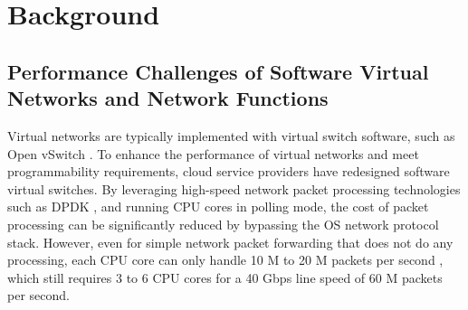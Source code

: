 \section{Background}
\label{clicknp:sec:background}

\subsection{Performance Challenges of Software Virtual Networks and Network Functions}

Virtual networks are typically implemented with virtual switch software, such as Open vSwitch \cite{pfaff2015design}.
To enhance the performance of virtual networks and meet programmability requirements, cloud service providers have redesigned software virtual switches.
By leveraging high-speed network packet processing technologies such as DPDK \cite{dpdk}, and running CPU cores in polling mode, the cost of packet processing can be significantly reduced by bypassing the OS network protocol stack.
However, even for simple network packet forwarding that does not do any processing, each CPU core can only handle 10 M to 20 M packets per second \cite{martins2014clickos,netbricks}, which still requires 3 to 6 CPU cores for a 40 Gbps line speed of 60 M packets per second.

